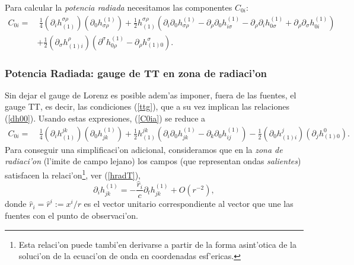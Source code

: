 Para calcular la \textit{potencia radiada} necesitamos las componentes $C_{0i}$:
\begin{align}
C_{0i} = & \  \frac{1}{4}(\partial_i h^{\sigma\rho}_{(1)})(\partial_0 h_{\sigma\rho}^{(1)}) +\frac{1}{2} h^{\sigma\rho}_{(1)}\left(\partial_i\partial_0 h^{(1)}_{\sigma\rho}-\partial_\rho\partial_0
h^{(1)}_{i\sigma}-\partial_\rho\partial_i h^{(1)}_{0\sigma}
+ \partial_\rho\partial_\sigma h^{(1)}_{0i}\right) \nonumber \\
& + \frac{1}{2} (\partial_\sigma h^\rho_{(1)i})\left(\partial^\sigma h^{(1)}_{0\rho}-\partial_\rho h^\sigma_{(1)0}\right). \label{C0ia}
\end{align}

\subsubsection{Potencia Radiada: gauge de TT en zona de radiaci'on}
Sin dejar el gauge de Lorenz es posible adem'as imponer, fuera de las fuentes, el gauge TT, es decir, las condiciones  (\ref{ttg}), que a su vez implican las relaciones (\ref{dh00}). Usando estas expresiones, (\ref{C0ia}) se reduce a
\begin{align}
C_{0i} = & \  \frac{1}{4}(\partial_i h^{jk}_{(1)})(\partial_0 h_{jk}^{(1)})
+\frac{1}{2}h^{jk}_{(1)}\left(\partial_i\partial_0 h^{(1)}_{jk} -\partial_k\partial_0 h^{(1)}_{ij}\right) - \frac{1}{2}(\partial_0 h^j_{(1)i})(\partial_j h^0_{(1)0}).
\end{align}
Para conseguir una simplificaci'on adicional, consideramos que en la \textit{zona de radiaci'on} (l'imite de campo lejano) los campos (que representan ondas \textit{salientes}) satisfacen la relaci'on\footnote{Esta relaci'on puede tambi'en derivarse a partir de la forma asint'otica de la soluci'on de la ecuaci'on de onda en coordenadas esf'ericas.}, ver (\ref{hradT}),
\begin{equation}\label{zrad}
\partial_i h^{(1)}_{jk}=-\frac{\hat{r}_i}{c}\partial_t h^{(1)}_{jk}+O(r^{-2}),
\end{equation}
donde $\hat{r}_i=\hat{r}^i:=x^i/r$ es el vector unitario correspondiente al vector que une las fuentes con el punto de observaci'on.

